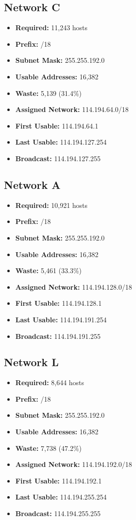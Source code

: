 \documentclass[12pt,a4paper]{report}
\begin{document}
\subsection{Network C}

\begin{itemize}
    \item \textbf{Required:} 11,243 hosts
    \item \textbf{Prefix:} /18
    \item \textbf{Subnet Mask:} 255.255.192.0
    \item \textbf{Usable Addresses:} 16,382
    \item \textbf{Waste:} 5,139 (31.4\%)
    \item \textbf{Assigned Network:} 114.194.64.0/18
    \item \textbf{First Usable:} 114.194.64.1
    \item \textbf{Last Usable:} 114.194.127.254
    \item \textbf{Broadcast:} 114.194.127.255
\end{itemize}

\subsection{Network A}

\begin{itemize}
    \item \textbf{Required:} 10,921 hosts
    \item \textbf{Prefix:} /18
    \item \textbf{Subnet Mask:} 255.255.192.0
    \item \textbf{Usable Addresses:} 16,382
    \item \textbf{Waste:} 5,461 (33.3\%)
    \item \textbf{Assigned Network:} 114.194.128.0/18
    \item \textbf{First Usable:} 114.194.128.1
    \item \textbf{Last Usable:} 114.194.191.254
    \item \textbf{Broadcast:} 114.194.191.255
\end{itemize}

\subsection{Network L}

\begin{itemize}
    \item \textbf{Required:} 8,644 hosts
    \item \textbf{Prefix:} /18
    \item \textbf{Subnet Mask:} 255.255.192.0
    \item \textbf{Usable Addresses:} 16,382
    \item \textbf{Waste:} 7,738 (47.2\%)
    \item \textbf{Assigned Network:} 114.194.192.0/18
    \item \textbf{First Usable:} 114.194.192.1
    \item \textbf{Last Usable:} 114.194.255.254
    \item \textbf{Broadcast:} 114.194.255.255
\end{itemize}
\end{document}
